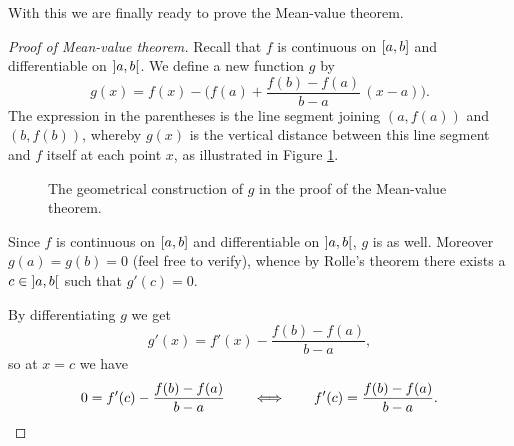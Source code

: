 \noindent
With this we are finally ready to prove the Mean-value theorem.

\begin{proof}[Proof of Mean-value theorem]
	Recall that $f$ is continuous on $\interval{a}{b}$ and differentiable on $\interval[open]{a}{b}$.
	We define a new function $g$ by
	\[
		g(x) = f(x) - \Big ( f(a) + \frac{f(b) - f(a)}{b - a} \, (x - a) \Big ).
	\]
	The expression in the parentheses is the line segment joining $(a, f(a))$ and $(b, f(b))$, whereby $g(x)$ is the vertical distance between this line segment and $f$ itself at each point $x$, as illustrated in Figure \ref{lec4:meanvalproof}.
	\begin{figure}
		\centering
		\caption{The geometrical construction of $g$ in the proof of the Mean-value theorem.}
		\label{lec4:meanvalproof}
	\end{figure}

	Since $f$ is continuous on $\interval{a}{b}$ and differentiable on $\interval[open]{a}{b}$, $g$ is as well.
	Moreover $g(a) = g(b) = 0$ (feel free to verify), whence by Rolle's theorem there exists a $c \in \interval[open]{a}{b}$ such that $g'(c) = 0$.

	By differentiating $g$ we get
	\[
		g'(x) = f'(x) - \frac{f(b) - f(a)}{b - a},
	\]
	so at $x = c$ we have
	\[
		0 = f'(c) - \frac{f(b) - f(a)}{b - a} \qquad \Longleftrightarrow \qquad f'(c) = \frac{f(b) - f(a)}{b - a}.\qedhere
	\]
\end{proof}

